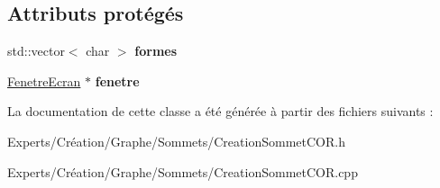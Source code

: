 \subsection*{Attributs protégés}
\begin{DoxyCompactItemize}
\item 
\mbox{\label{class_creation_sommet_c_o_r_ab2a71a91b6a4cdf98c6d5bb8c38392ed}} 
std\+::vector$<$ char $>$ {\bfseries formes}
\item 
\mbox{\label{class_creation_sommet_c_o_r_a1beebfec5b14c6d0a5942aabf076d845}} 
\mbox{\hyperlink{class_fenetre_ecran}{Fenetre\+Ecran}} $\ast$ {\bfseries fenetre}
\end{DoxyCompactItemize}


La documentation de cette classe a été générée à partir des fichiers suivants \+:\begin{DoxyCompactItemize}
\item 
Experts/\+Création/\+Graphe/\+Sommets/Creation\+Sommet\+C\+O\+R.\+h\item 
Experts/\+Création/\+Graphe/\+Sommets/Creation\+Sommet\+C\+O\+R.\+cpp\end{DoxyCompactItemize}
